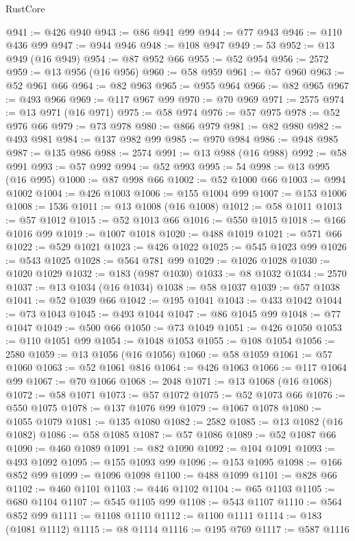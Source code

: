 \begin{lexlean}{RustCore}
\begin{coremodule}
@941 := @426 @940
@943 := @86 @941 @99
@944 := @77 @943
@946 := @110 @436 @99
@947 := @944 @946
@948 := @108 @947
@949 := 53
@952 := @13 @949 (@16 @949)
@954 := @87 @952 @66
@955 := @52 @954
@956 := 2572
@959 := @13 @956 (@16 @956)
@960 := @58 @959
@961 := @57 @960
@963 := @52 @961 @66
@964 := @82 @963
@965 := @955 @964
@966 := @82 @965
@967 := @493 @966
@969 := @117 @967 @99
@970 := @70 @969
@971 := 2575
@974 := @13 @971 (@16 @971)
@975 := @58 @974
@976 := @57 @975
@978 := @52 @976 @66
@979 := @73 @978
@980 := @866 @979
@981 := @82 @980
@982 := @493 @981
@984 := @137 @982 @99
@985 := @970 @984
@986 := @948 @985
@987 := @135 @986
@988 := 2574
@991 := @13 @988 (@16 @988)
@992 := @58 @991
@993 := @57 @992
@994 := @52 @993
@995 := 54
@998 := @13 @995 (@16 @995)
@1000 := @87 @998 @66
@1002 := @52 @1000 @66
@1003 := @994 @1002
@1004 := @426 @1003
@1006 := @155 @1004 @99
@1007 := @153 @1006
@1008 := 1536
@1011 := @13 @1008 (@16 @1008)
@1012 := @58 @1011
@1013 := @57 @1012
@1015 := @52 @1013 @66
@1016 := @550 @1015
@1018 := @166 @1016 @99
@1019 := @1007 @1018
@1020 := @488 @1019
@1021 := @571 @66
@1022 := @529 @1021
@1023 := @426 @1022
@1025 := @545 @1023 @99
@1026 := @543 @1025
@1028 := @564 @781 @99
@1029 := @1026 @1028
@1030 := @1020 @1029
@1032 := @183 (@987 @1030)
@1033 := @8 @1032
@1034 := 2570
@1037 := @13 @1034 (@16 @1034)
@1038 := @58 @1037
@1039 := @57 @1038
@1041 := @52 @1039 @66
@1042 := @195 @1041
@1043 := @433 @1042
@1044 := @73 @1043
@1045 := @493 @1044
@1047 := @86 @1045 @99
@1048 := @77 @1047
@1049 := @500 @66
@1050 := @73 @1049
@1051 := @426 @1050
@1053 := @110 @1051 @99
@1054 := @1048 @1053
@1055 := @108 @1054
@1056 := 2580
@1059 := @13 @1056 (@16 @1056)
@1060 := @58 @1059
@1061 := @57 @1060
@1063 := @52 @1061 @816
@1064 := @426 @1063
@1066 := @117 @1064 @99
@1067 := @70 @1066
@1068 := 2048
@1071 := @13 @1068 (@16 @1068)
@1072 := @58 @1071
@1073 := @57 @1072
@1075 := @52 @1073 @66
@1076 := @550 @1075
@1078 := @137 @1076 @99
@1079 := @1067 @1078
@1080 := @1055 @1079
@1081 := @135 @1080
@1082 := 2582
@1085 := @13 @1082 (@16 @1082)
@1086 := @58 @1085
@1087 := @57 @1086
@1089 := @52 @1087 @66
@1090 := @460 @1089
@1091 := @82 @1090
@1092 := @104 @1091
@1093 := @493 @1092
@1095 := @155 @1093 @99
@1096 := @153 @1095
@1098 := @166 @852 @99
@1099 := @1096 @1098
@1100 := @488 @1099
@1101 := @828 @66
@1102 := @460 @1101
@1103 := @446 @1102
@1104 := @65 @1103
@1105 := @680 @1104
@1107 := @545 @1105 @99
@1108 := @543 @1107
@1110 := @564 @852 @99
@1111 := @1108 @1110
@1112 := @1100 @1111
@1114 := @183 (@1081 @1112)
@1115 := @8 @1114
@1116 := @195 @769
@1117 := @587 @1116

\end{coremodule}
\end{lexlean}
